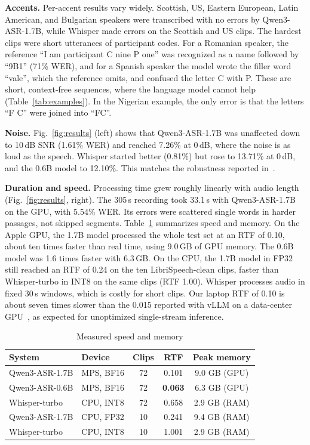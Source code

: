 \documentclass[conference]{IEEEtran}
\begin{document}
\textbf{Accents.} Per-accent results vary widely. Scottish, US, Eastern European, Latin American, and Bulgarian speakers were transcribed with no errors by Qwen3-ASR-1.7B, while Whisper made errors on the Scottish and US clips. The hardest clips were short utterances of participant codes. For a Romanian speaker, the reference ``I am participant C nine P one'' was recognized as a name followed by ``9B1'' (71\% WER), and for a Spanish speaker the model wrote the filler word ``vale'', which the reference omits, and confused the letter C with P. These are short, context-free sequences, where the language model cannot help (Table~\ref{tab:examples}). In the Nigerian example, the only error is that the letters ``F C'' were joined into ``FC''.

\textbf{Noise.} Fig.~\ref{fig:results} (left) shows that Qwen3-ASR-1.7B was unaffected down to 10\,dB SNR (1.61\% WER) and reached 7.26\% at 0\,dB, where the noise is as loud as the speech. Whisper started better (0.81\%) but rose to 13.71\% at 0\,dB, and the 0.6B model to 12.10\%. This matches the robustness reported in~\cite{qwen3asr}.

\textbf{Duration and speed.} Processing time grew roughly linearly with audio length (Fig.~\ref{fig:results}, right). The 305\,s recording took 33.1\,s with Qwen3-ASR-1.7B on the GPU, with 5.54\% WER. Its errors were scattered single words in harder passages, not skipped segments. Table~\ref{tab:speed} summarizes speed and memory. On the Apple GPU, the 1.7B model processed the whole test set at an RTF of 0.10, about ten times faster than real time, using 9.0\,GB of GPU memory. The 0.6B model was 1.6 times faster with 6.3\,GB. On the CPU, the 1.7B model in FP32 still reached an RTF of 0.24 on the ten LibriSpeech-clean clips, faster than Whisper-turbo in INT8 on the same clips (RTF 1.00). Whisper processes audio in fixed 30\,s windows, which is costly for short clips. Our laptop RTF of 0.10 is about seven times slower than the 0.015 reported with vLLM on a data-center GPU~\cite{qwen3asr}, as expected for unoptimized single-stream inference.

\begin{table}[t]
\centering
\caption{Measured speed and memory}
\label{tab:speed}
\setlength{\tabcolsep}{3pt}
\begin{tabular}{llccc}
\toprule
System & Device & Clips & RTF & Peak memory \\
\midrule
Qwen3-ASR-1.7B & MPS, BF16 & 72 & 0.101 & 9.0 GB (GPU) \\
Qwen3-ASR-0.6B & MPS, BF16 & 72 & \textbf{0.063} & 6.3 GB (GPU) \\
Whisper-turbo & CPU, INT8 & 72 & 0.658 & 2.9 GB (RAM) \\
Qwen3-ASR-1.7B & CPU, FP32 & 10 & 0.241 & 9.4 GB (RAM) \\
Whisper-turbo & CPU, INT8 & 10 & 1.001 & 2.9 GB (RAM) \\
\bottomrule
\end{tabular}
\end{table}
\end{document}
